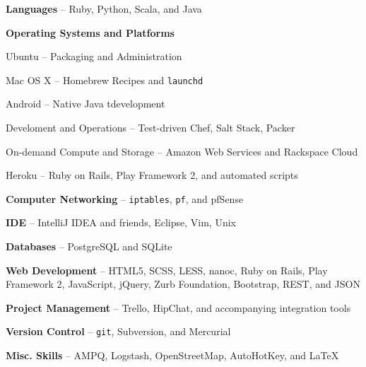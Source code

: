 \documentclass[10pt, letter]{article}
\newcommand{\reference}[4]{
\subsection*{#1 | {\footnotesize{#2}}}
#3 -- \href{mailto:#4}{\texttt{#4}}
}
\newenvironment{packed_item}{
\begin{itemize}
  \setlength{\itemsep}{1pt}
  \setlength{\parskip}{0pt}
  \setlength{\parsep}{0pt}
}{\end{itemize}}
\begin{document}
\begin{multicols}{2}
\begin{packed_item}
    \item \textbf{Languages} -- Ruby, Python, Scala, and Java
    \item \textbf{Operating Systems and Platforms}
        \begin{packed_item}
            \item Ubuntu -- Packaging and Administration
            \item Mac OS X -- Homebrew Recipes and \texttt{launchd}
            \item Android -- Native Java tdevelopment
            \item Develoment and Operations -- Test-driven Chef, Salt Stack, Packer
            \item On-demand Compute and Storage -- Amazon Web Services and Rackspace Cloud
            \item Heroku -- Ruby on Rails, Play Framework 2, and automated scripts
        \end{packed_item}
    \item \textbf{Computer Networking} -- \texttt{iptables}, \texttt{pf}, and pfSense
    \item \textbf{IDE} -- IntelliJ IDEA and friends, Eclipse, Vim, Unix
    \item \textbf{Databases} -- PostgreSQL and SQLite
    \item \textbf{Web Development} -- HTML5, SCSS, LESS, nanoc, Ruby on Rails, Play Framework 2, JavaScript, jQuery, Zurb Foundation, Bootstrap, REST, and JSON
    \item \textbf{Project Management} -- Trello, HipChat, and accompanying integration tools
    \item \textbf{Version Control} -- \texttt{git}, Subversion, and Mercurial
    \item \textbf{Misc. Skills} -- AMPQ, Logstash, OpenStreetMap, AutoHotKey, and \LaTeX
\end{packed_item}








\end{multicols}
\end{document}
